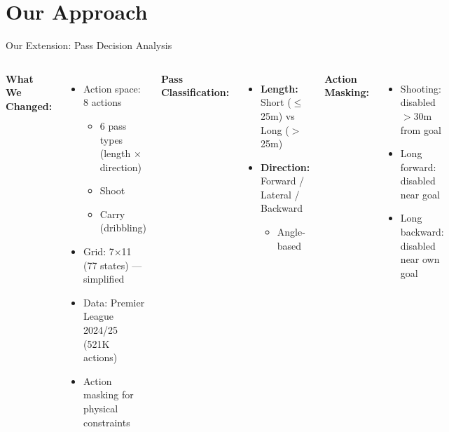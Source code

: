 \documentclass[aspectratio=169]{beamer}
\begin{document}
\section{Our Approach}

\begin{frame}{Our Extension: Pass Decision Analysis}
\begin{columns}[T]
\textbf{What We Changed:}
\begin{itemize}
    \item[\checkmark] Action space: 8 actions
    \begin{itemize}
        \item 6 pass types (length × direction)
        \item Shoot
        \item Carry (dribbling)
    \end{itemize}
    \item[\checkmark] Grid: 7×11 (77 states) — simplified
    \item[\checkmark] Data: Premier League 2024/25 (521K actions)
    \item[\checkmark] Action masking for physical constraints
\end{itemize}

\textbf{Pass Classification:}
\begin{itemize}
    \item \textbf{Length:} Short ($\leq$25m) vs Long ($>$25m)
    \item \textbf{Direction:} Forward / Lateral / Backward
    \begin{itemize}
        \item Angle-based
    \end{itemize}
\end{itemize}

\vspace{0.3cm}
\textbf{Action Masking:}
\begin{itemize}
    \item Shooting: disabled $>$30m from goal
    \item Long forward: disabled near goal
    \item Long backward: disabled near own goal
\end{itemize}
\end{columns}
\end{frame}
\end{document}
